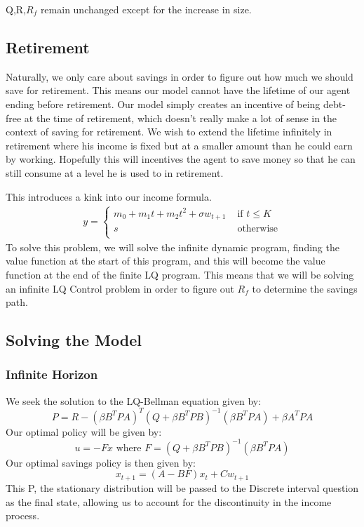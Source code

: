 \documentclass[10pt]{paper}
\begin{document}
Q,R,$R_f$ remain unchanged except for the increase in size.

\subsection*{Retirement}

Naturally, we only care about savings in order to figure out how much
we should save for retirement. This means our model cannot have the
lifetime of our agent ending before retirement. Our model simply
creates an incentive of being debt-free at the time of retirement, which doesn't
really make a lot of sense in the context of saving for retirement. We
wish to extend the lifetime infinitely in retirement where his income
is fixed but at a smaller amount than he could earn by
working. Hopefully this will incentives the agent to save money so
that he can still consume at a level he is used to in retirement.

This introduces a kink into our income formula.
\begin{align*}
  y = \begin{cases}
    m_0 + m_1t + m_2t^2 + \sigma w_{t+1}& \text{ if } t \leq K\\
    s & \text{ otherwise}\\
    \end{cases}
\end{align*}
To solve this problem, we will solve the infinite dynamic program,
finding the value function at the start of this program, and this will
become the value function at the end of the finite LQ program. This
means that we will be solving an infinite LQ Control problem in order
to figure out $R_f$ to determine the savings path.

\subsection*{Solving the Model}

\subsubsection*{Infinite Horizon}

We seek the solution to the LQ-Bellman equation given by:
$$P=R−(β B^T P A )^T (Q + β B^T P B)^{-1} (βB^T P A ) + βA^T P A$$
Our optimal policy will be given by:
$$u = -F x \text{ where } F = (Q + \beta B^T
P B )^{-1} ( \beta B^T P A)$$
Our optimal savings policy is then given by:
$$x_{t+1} = (A-BF)x_t + Cw_{t+1}$$
This P, the stationary distribution will be passed to the
Discrete interval question as the final state, allowing us to account
for the discontinuity in the income process.
\end{document}
